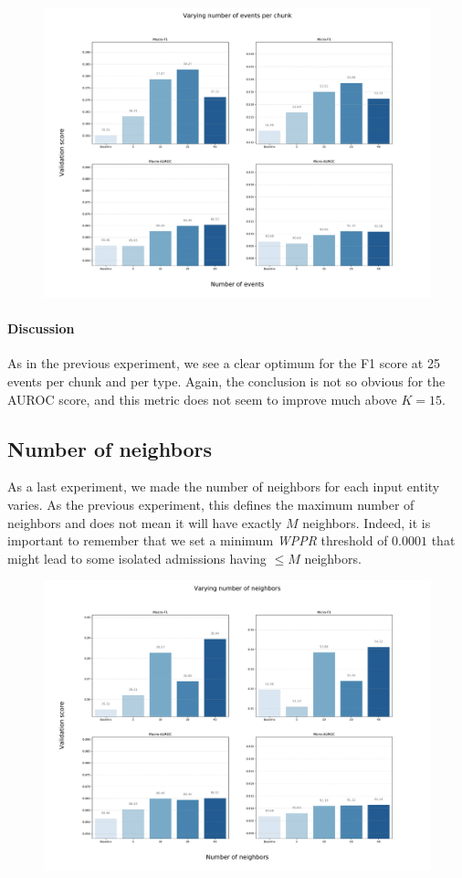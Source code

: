 \begin{figure}[H]
 \centering
 \includegraphics[width=\textwidth]{figures/exp-events.pdf}
\end{figure}
\paragraph{Discussion} As in the previous experiment, we see a clear optimum for the F1 score at 25 events per chunk and per type. Again, the conclusion is not so obvious for the AUROC score, and this metric does not seem to improve much above $K=15$.

\newpage
\subsection{Number of neighbors}
As a last experiment, we made the number of neighbors for each input entity varies. As the previous experiment, this defines the maximum number of neighbors and does not mean it will have exactly $M$ neighbors. Indeed, it is important to remember that we set a minimum \emph{WPPR} threshold of $0.0001$ that might lead to some isolated admissions having $\leq M$ neighbors.

\begin{figure}[H]
 \centering
 \includegraphics[width=\textwidth]{figures/exp-neighbors.pdf}
\end{figure}

